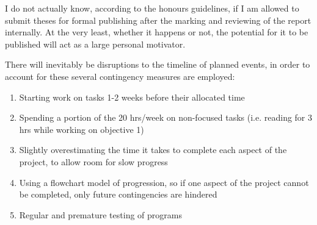 I do not actually know, according to the honours guidelines, if I am allowed to submit theses for formal publishing after the marking and reviewing of the report internally. At the very least, whether it happens or not, the potential for it to be published will act as a large personal motivator.

There will inevitably be disruptions to the timeline of planned events, in order to account for these several contingency measures are employed:
\begin{enumerate}
\item Starting work on tasks 1-2 weeks before their allocated time
\item Spending a portion of the 20 hrs/week on non-focused tasks (i.e. reading for 3 hrs while working on objective 1)
\item Slightly overestimating the time it takes to complete each aspect of the project, to allow room for slow progress
\item Using a flowchart model of progression, so if one aspect of the project cannot be completed, only future contingencies are hindered
\item Regular and premature testing of programs
\end{enumerate}

